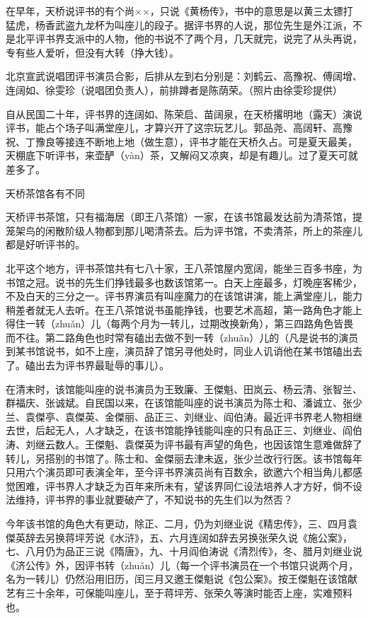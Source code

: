 \documentclass[12pt,UTF8]{ctexbook}
\begin{document}
在早年，天桥说评书的有个尚××，只说《黄杨传》，书中的意思是以黄三太镖打猛虎，杨香武盗九龙杯为叫座儿的段子。据评书界的人说，那位先生是外江派，不是北平评书界支派中的人物，他的书说不了两个月，几天就完，说完了从头再说，专有些人爱听，但没有大转（挣大钱）。

北京宣武说唱团评书演员合影，后排从左到右分别是：刘鹤云、高豫祝、傅阔增、连阔如、徐雯珍（说唱团负责人），前排蹲者是陈荫荣。（照片由徐雯珍提供）



自从民国二十年，评书界的连阔如、陈荣启、苗阔泉，在天桥撂明地（露天）演说评书，能占个场子叫满堂座儿，才算兴开了这宗玩艺儿。郭品尧、高阔轩、高豫祝、丁豫良等接连不断地上地（做生意），评书才能在天桥久占。可是夏天最美，天棚底下听评书，来壶酽（yàn）茶，又解闷又凉爽，却是有趣儿。过了夏天可就差多了。





天桥茶馆各有不同


天桥评书茶馆，只有福海居（即王八茶馆）一家，在该书馆最发达前为清茶馆，提笼架鸟的闲散阶级人物都到那儿喝清茶去。后为评书馆，不卖清茶，所上的茶座儿都是好听评书的。

北平这个地方，评书茶馆共有七八十家，王八茶馆屋内宽阔，能坐三百多书座，为书馆之冠。说书的先生们挣钱最多也数该馆笫一。白天上座最多，灯晚座客稀少，不及白天的三分之一。评书界演员有叫座魔力的在该馆讲演，能上满堂座儿，能力稍差者就无人去听。在王八茶馆说书虽能挣钱，也要艺术高超，第一路角色才能上得住一转（zhuǎn）儿（每两个月为一转儿，过期改换新角），第三四路角色皆畏而不往。第二路角色也时常有磕出去做不到一转（zhuǎn）儿的（凡是说书的演员到某书馆说书，如不上座，演员辞了馆另寻他处时，同业人讥诮他在某书馆磕出去了。磕出去为评书界最耻辱的事儿）。

在清末时，该馆能叫座的说书演员为王致廉、王傑魁、田岚云、杨云清、张智兰、群福庆、张诚斌。自民国以来，在该馆能叫座的说书演员为陈士和、潘诚立、张少兰、袁傑亭、袁傑英、金傑丽、品正三、刘继业、阎伯涛。最近评书界老人物相继去世，后起无人，人才缺乏，在该书馆能挣钱能叫座的只有品正三、刘继业、阎伯涛、刘继云数人。王傑魁、袁傑英为评书最有声望的角色，也因该馆生意难做辞了转儿，另搭别的书馆了。陈士和、金傑丽去津未返，张少兰改行行医。该书馆每年只用六个演员即可表演全年，至今评书界演员尚有百数余，欲邀六个相当角儿都感觉困难，评书界人才缺乏为百年来所未有，望该界同仁设法培养人才方好，倘不设法维持，评书界的事业就要破产了，不知说书的先生们以为然否？

今年该书馆的角色大有更动，除正、二月，仍为刘继业说《精忠传》，三、四月袁傑英辞去另换蒋坪芳说《水浒》，五、六月连阔如辞去另换张荣久说《施公案》，七、八月仍为品正三说《隋唐》，九、十月阎伯涛说《清烈传》，冬、腊月刘继业说《济公传》外，因评书转（zhuǎn）儿（每一个评书演员在一个书馆只说两个月，名为一转儿）仍然沿用旧历，闰三月又邀王傑魁说《包公案》。按王傑魁在该馆献艺有三十余年，可保能叫座儿，至于蒋坪芳、张荣久等演时能否上座，实难预料也。
\end{document}
